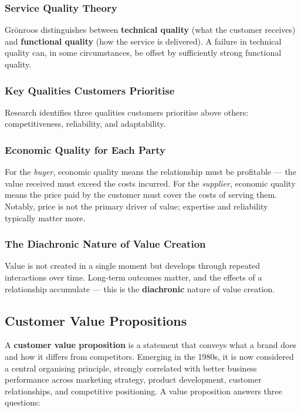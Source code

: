 \subsubsection*{Service Quality Theory}

Grönroos distinguishes between \textbf{technical quality} (what the customer receives) 
and \textbf{functional quality} (how the service is delivered). A failure in technical 
quality can, in some circumstances, be offset by sufficiently strong functional quality.

\subsubsection*{Key Qualities Customers Prioritise}

Research identifies three qualities customers prioritise above others: competitiveness, 
reliability, and adaptability.

\subsubsection*{Economic Quality for Each Party}

For the \textit{buyer}, economic quality means the relationship must be profitable --- 
the value received must exceed the costs incurred. For the \textit{supplier}, economic 
quality means the price paid by the customer must cover the costs of serving them. 
Notably, price is not the primary driver of value; expertise and reliability typically 
matter more.

\subsubsection*{The Diachronic Nature of Value Creation}

Value is not created in a single moment but develops through repeated interactions over 
time. Long-term outcomes matter, and the effects of a relationship accumulate --- this 
is the \textbf{diachronic} nature of value creation.

\subsection*{Customer Value Propositions}

A \textbf{customer value proposition} is a statement that conveys what a brand does and 
how it differs from competitors. Emerging in the 1980s, it is now considered a central 
organising principle, strongly correlated with better business performance across 
marketing strategy, product development, customer relationships, and competitive 
positioning. A value proposition answers three questions:

